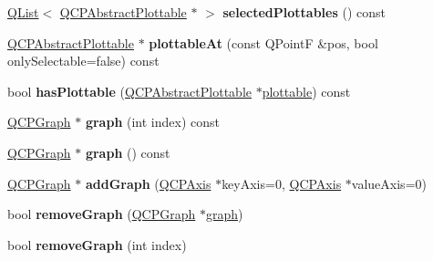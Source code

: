 \begin{DoxyCompactItemize}
\mbox{\label{class_q_custom_plot_a06f1b41bb05f56861de97b5fae8dd107}} 
\hyperlink{class_q_list}{Q\+List}$<$ \hyperlink{class_q_c_p_abstract_plottable}{Q\+C\+P\+Abstract\+Plottable} $\ast$ $>$ {\bfseries selected\+Plottables} () const
\item 
\mbox{\label{class_q_custom_plot_ac3cb6044d3238bf6b7f2280ce89e80bc}} 
\hyperlink{class_q_c_p_abstract_plottable}{Q\+C\+P\+Abstract\+Plottable} $\ast$ {\bfseries plottable\+At} (const Q\+PointF \&pos, bool only\+Selectable=false) const
\item 
\mbox{\label{class_q_custom_plot_a72cefbfbb9e699940e37be605bd9c51e}} 
bool {\bfseries has\+Plottable} (\hyperlink{class_q_c_p_abstract_plottable}{Q\+C\+P\+Abstract\+Plottable} $\ast$\hyperlink{class_q_custom_plot_a32de81ff53e263e785b83b52ecd99d6f}{plottable}) const
\item 
\mbox{\label{class_q_custom_plot_ae9904b9e9415ea06062a113cb86f8f95}} 
\hyperlink{class_q_c_p_graph}{Q\+C\+P\+Graph} $\ast$ {\bfseries graph} (int index) const
\item 
\mbox{\label{class_q_custom_plot_a0d29a7dbf5888ca7b913eb34101618c5}} 
\hyperlink{class_q_c_p_graph}{Q\+C\+P\+Graph} $\ast$ {\bfseries graph} () const
\item 
\mbox{\label{class_q_custom_plot_a81da9c07843d3e2beb1133dadb49acfc}} 
\hyperlink{class_q_c_p_graph}{Q\+C\+P\+Graph} $\ast$ {\bfseries add\+Graph} (\hyperlink{class_q_c_p_axis}{Q\+C\+P\+Axis} $\ast$key\+Axis=0, \hyperlink{class_q_c_p_axis}{Q\+C\+P\+Axis} $\ast$value\+Axis=0)
\item 
\mbox{\label{class_q_custom_plot_a903561be895fb6528a770d66ac5e6713}} 
bool {\bfseries remove\+Graph} (\hyperlink{class_q_c_p_graph}{Q\+C\+P\+Graph} $\ast$\hyperlink{class_q_custom_plot_a6ecae130f684b25276fb47bd3a5875c6}{graph})
\item 
\mbox{\label{class_q_custom_plot_a9554b3d2d5b10c0f884bd4010b6c192c}} 
bool {\bfseries remove\+Graph} (int index)
\item 
\mbox{\label{class_q_custom_plot_ab0f3abff2d2f7df3668b5836f39207fa}} 

\end{DoxyCompactItemize}
